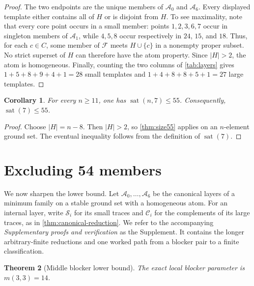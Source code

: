 \documentclass[a4paper,fleqn,longmktitle]{cas-sc}
\newtheorem{theorem}{Theorem}[section]
\newtheorem{corollary}[theorem]{Corollary}
\theoremstyle{definition}
\theoremstyle{remark}
\newcommand{\family}{\mathcal{F}}
\newcommand{\sat}{\operatorname{sat}}
\begin{document}
\begin{proof}
The two endpoints are the unique members of $\mathcal A_0$ and
$\mathcal A_6$.  Every displayed template either contains all of $H$ or is
disjoint from $H$.  To see maximality, note that every core point occurs in a
small member: points $1,2,3,6,7$ occur in singleton members of
$\mathcal A_1$, while $4,5,8$ occur respectively in $24$, $15$, and $18$.
Thus, for each $c\in C$, some member of $\family$ meets $H\cup\{c\}$ in a
nonempty proper subset.  No strict superset of $H$ can therefore have the
atom property.  Since $|H|>2$, the atom is homogeneous.  Finally, counting
the two columns of \cref{tab:layers} gives
$1+5+8+9+4+1=28$ small templates and
$1+4+8+8+5+1=27$ large templates.
\end{proof}

\par\medskip

\begin{corollary}
\label{cor:main-bound}
For every $n\geq11$, one has $\sat(n,7)\leq55$.  Consequently,
$\sat(7)\leq55$.
\end{corollary}

\begin{proof}
Choose $|H|=n-8$.  Then $|H|>2$, so \cref{thm:size55} applies on an
$n$-element ground set.  The eventual inequality follows from the definition
of $\sat(7)$.
\end{proof}

\section{Excluding 54 members}
\label{sec:exact-seven}

We now sharpen the lower bound.  Let
$\mathcal A_0,\ldots,\mathcal A_6$ be the canonical layers of a minimum
family on a stable ground set with a homogeneous atom.  For an internal layer,
write $\mathcal S_i$ for its small traces and $\mathcal C_i$ for the
complements of its large traces, as in \cref{thm:canonical-reduction}.
We refer to the accompanying \emph{Supplementary proofs and verification}
as the Supplement.  It contains the longer arbitrary-finite reductions and
one worked path from a blocker pair to a finite classification.

\begin{theorem}[Middle blocker lower bound]
\label{thm:m33}
The exact local blocker parameter is $m(3,3)=14$.
\end{theorem}
\end{document}
